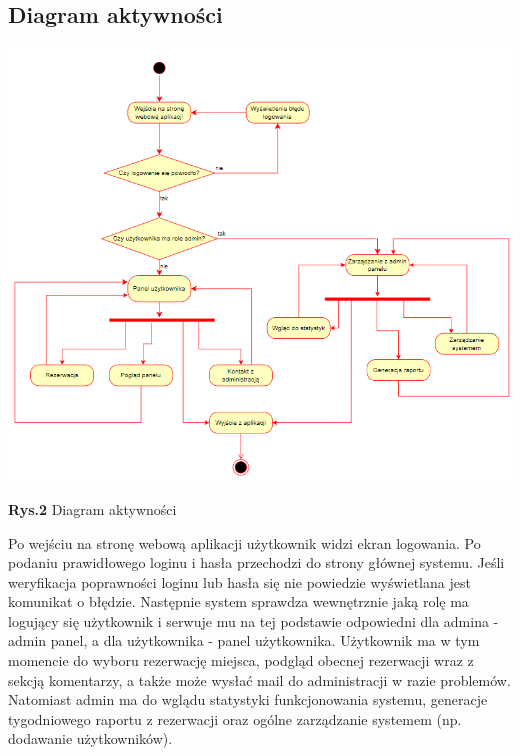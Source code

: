 \documentclass{article}
\begin{document}
\subsection{Diagram aktywności}
\hspace*{-3cm}\includegraphics[scale=0.8]{activity_diagram}
\begin{center}\textbf{Rys.2} Diagram aktywności \end{center}
Po wejściu na stronę webową aplikacji użytkownik widzi ekran logowania. Po podaniu prawidłowego loginu i hasła przechodzi do strony głównej systemu. Jeśli weryfikacja poprawności loginu lub hasła się nie powiedzie wyświetlana jest komunikat o błędzie. Następnie system sprawdza wewnętrznie jaką rolę ma logujący się użytkownik i serwuje mu na tej podstawie odpowiedni dla admina - admin panel, a dla użytkownika - panel użytkownika. Użytkownik ma w tym momencie do wyboru rezerwację miejsca, podgląd obecnej rezerwacji wraz z sekcją komentarzy, a także może wysłać mail do administracji w razie problemów. Natomiast admin ma do wglądu statystyki funkcjonowania systemu, generacje tygodniowego raportu z rezerwacji oraz ogólne zarządzanie systemem (np. dodawanie użytkowników).
\end{document}
